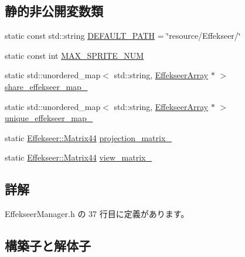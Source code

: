 \subsection*{静的非公開変数類}
\begin{DoxyCompactItemize}
\item 
static const std\+::string \mbox{\hyperlink{class_effekseer_manager_a9a849a395605383e9c7e7850379e8b22}{D\+E\+F\+A\+U\+L\+T\+\_\+\+P\+A\+TH}} = \char`\"{}resource/Effekseer/\char`\"{}
\item 
static const int \mbox{\hyperlink{class_effekseer_manager_a4d87b5a997a223ae8b253a9eab025c3f}{M\+A\+X\+\_\+\+S\+P\+R\+I\+T\+E\+\_\+\+N\+UM}}
\item 
static std\+::unordered\+\_\+map$<$ std\+::string, \mbox{\hyperlink{class_effekseer_array}{Effekseer\+Array}} $\ast$ $>$ \mbox{\hyperlink{class_effekseer_manager_a67498df05e8dda8654dd5e8a35318c95}{share\+\_\+effekseer\+\_\+map\+\_\+}}
\item 
static std\+::unordered\+\_\+map$<$ std\+::string, \mbox{\hyperlink{class_effekseer_array}{Effekseer\+Array}} $\ast$ $>$ \mbox{\hyperlink{class_effekseer_manager_a6ac2968072bfe7f1077a7f78c2b968e6}{unique\+\_\+effekseer\+\_\+map\+\_\+}}
\item 
static \mbox{\hyperlink{struct_effekseer_1_1_matrix44}{Effekseer\+::\+Matrix44}} \mbox{\hyperlink{class_effekseer_manager_a04d1e978c13b53e668ac3c56c6a92b3a}{projection\+\_\+matrix\+\_\+}}
\item 
static \mbox{\hyperlink{struct_effekseer_1_1_matrix44}{Effekseer\+::\+Matrix44}} \mbox{\hyperlink{class_effekseer_manager_a0ea3c32637818a3fab28fb7d17a03970}{view\+\_\+matrix\+\_\+}}
\end{DoxyCompactItemize}


\subsection{詳解}


 Effekseer\+Manager.\+h の 37 行目に定義があります。



\subsection{構築子と解体子}
\mbox{\label{class_effekseer_manager_a4338611775d36aaef84ddb178b7f13ce}} 
